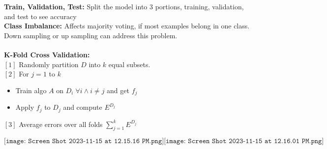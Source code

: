 \textbf{Train, Validation, Test:} Split the model into $3$ portions, training, validation, and test to see accuracy\\
\textbf{Class Imbalance:} Affects majority voting, if most examples belong in one class. Down sampling or up sampling can address this problem.\\
\\
\textbf{K-Fold Cross Validation:} \\
$[1]$ Randomly partition $D$ into $k$ equal subsets.\\
$[2]$ For $j = 1$ to $k$\\
\begin{itemize}
    \item Train algo $A$ on $D_i \;\forall i \wedge i \neq j$ and get $f_j$\\
    \item Apply $f_j$ to $D_j$ and compute $E^{D_j}$\\
\end{itemize}
$[3]$ Average errors over all folds $\sum_{j=1}^k E^{D_j}$

$$
\texttt{[image: Screen Shot 2023-11-15 at 12.15.16 PM.png]} \texttt{[image: Screen Shot 2023-11-15 at 12.16.01 PM.png]}
$$   

